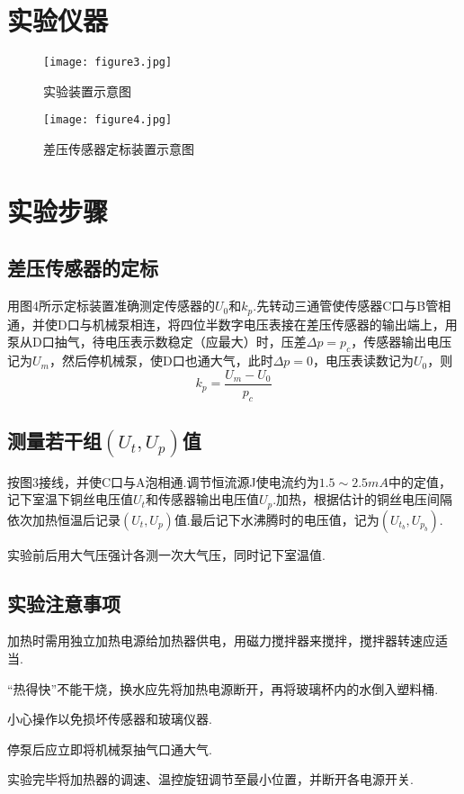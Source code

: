 \documentclass{thureport}
\begin{document}
\section{实验仪器}
\begin{figure}[h]
	\begin{minipage}[t]{0.45\linewidth}
		\centering
		\texttt{[image: figure3.jpg]}
		\caption{实验装置示意图}
	\end{minipage}
	\hfill
	\begin{minipage}[t]{0.45\linewidth}
		\centering
		\texttt{[image: figure4.jpg]}
		\caption{差压传感器定标装置示意图}
	\end{minipage}
\end{figure}

\section{实验步骤}
\subsection{差压传感器的定标}
用图4所示定标装置准确测定传感器的$U_0$和$k_p$.先转动三通管使传感器C口与B管相通，并使D口与机械泵相连，将四位半数字电压表接在差压传感器的输出端上，用泵从D口抽气，待电压表示数稳定（应最大）时，压差$\Delta p=p_c$，传感器输出电压记为$U_m$，然后停机械泵，使D口也通大气，此时$\Delta p=0$，电压表读数记为$U_0$，则
$$k_p=\frac{U_m-U_0}{p_c}$$

\subsection{测量若干组$(U_t,U_p)$值}
按图3接线，并使C口与A泡相通.调节恒流源J使电流约为$1.5\sim2.5mA$中的定值，记下室温下铜丝电压值$U_t$和传感器输出电压值$U_p$.加热，根据估计的铜丝电压间隔依次加热恒温后记录$(U_t,U_p)$值.最后记下水沸腾时的电压值，记为$(U_{t_b},U_{p_b})$.

实验前后用大气压强计各测一次大气压，同时记下室温值.

\subsection{实验注意事项}
\begin{clause}
	\item 加热时需用独立加热电源给加热器供电，用磁力搅拌器来搅拌，搅拌器转速应适当.
	\item “热得快”不能干烧，换水应先将加热电源断开，再将玻璃杯内的水倒入塑料桶.
	\item 小心操作以免损坏传感器和玻璃仪器.
	\item 停泵后应立即将机械泵抽气口通大气.
	\item 实验完毕将加热器的调速、温控旋钮调节至最小位置，并断开各电源开关.
\end{clause}
\end{document}
